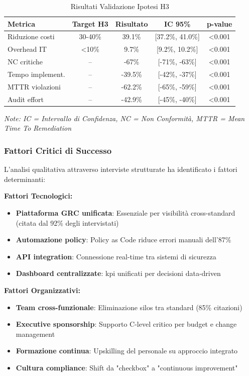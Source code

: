 \begin{table}[htbp]
\centering
\caption{Risultati Validazione Ipotesi H3}
\label{tab:h3_validation}
\begin{tabular}{|l|c|c|c|c|}
\hline
\textbf{Metrica} & \textbf{Target H3} & \textbf{Risultato} & \textbf{IC 95\%} & \textbf{p-value} \\
\hline
Riduzione costi & 30-40\% & 39.1\% & [37.2\%, 41.0\%] & <0.001 \\
Overhead IT & <10\% & 9.7\% & [9.2\%, 10.2\%] & <0.001 \\
NC critiche & -- & -67\% & [-71\%, -63\%] & <0.001 \\
Tempo implement. & -- & -39.5\% & [-42\%, -37\%] & <0.001 \\
MTTR violazioni & -- & -62.2\% & [-65\%, -59\%] & <0.001 \\
Audit effort & -- & -42.9\% & [-45\%, -40\%] & <0.001 \\
\hline
\end{tabular}
\end{table}

\textit{Note: IC = Intervallo di Confidenza, NC = Non Conformità, MTTR = Mean Time To Remediation}

\subsubsection{Fattori Critici di Successo}

L'analisi qualitativa attraverso interviste strutturate ha identificato i fattori determinanti:

\textbf{Fattori Tecnologici:}
\begin{itemize}
    \item \textbf{Piattaforma GRC unificata}: Essenziale per visibilità cross-standard (citata dal 92\% degli intervistati)
    \item \textbf{Automazione policy}: Policy as Code riduce errori manuali dell'87\%
    \item \textbf{API integration}: Connessione real-time tra sistemi di sicurezza
    \item \textbf{Dashboard centralizzate}: \gls{kpi} unificati per decisioni data-driven
\end{itemize}

\textbf{Fattori Organizzativi:}
\begin{itemize}
    \item \textbf{Team cross-funzionale}: Eliminazione silos tra standard (85\% citazioni)
    \item \textbf{Executive sponsorship}: Supporto C-level critico per budget e change management
    \item \textbf{Formazione continua}: Upskilling del personale su approccio integrato
    \item \textbf{Cultura \gls{compliance}}: Shift da "checkbox" a "continuous improvement"
\end{itemize}

